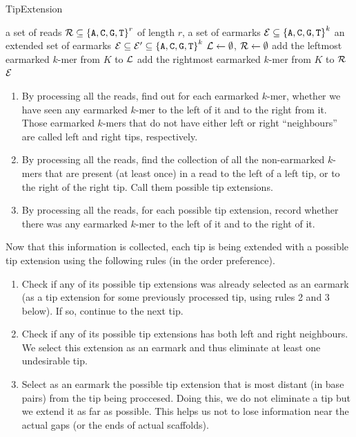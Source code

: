\documentclass[12pt]{article}
\def\acgt{\{{\tt A,C,G,T}\}}
\begin{document}
\begin{algorithm}
\caption{TipExtension}
\label{alg:tipextension}
\begin{algorithmic}%
  \REQUIRE a set of reads ${\cal R} \subseteq {\acgt}^r$ of length $r$, 
    a set of earmarks ${\cal E} \subseteq {\acgt}^k$
  \ENSURE an extended set of earmarks ${\cal E} \subseteq {\cal E'} \subseteq {\acgt}^k$
  \STATE ${\cal L} \gets \emptyset$, ${\cal R} \gets \emptyset$ 
    \STATE add the leftmost earmarked $k$-mer from $K$ to ${\cal L}$
    \STATE add the rightmost earmarked $k$-mer from $K$ to ${\cal R}$
  \ENDFOR
  \RETURN ${\cal E}$
\end{algorithmic}
\end{algorithm}


\begin{enumerate}
\item By processing all the reads, find out for each earmarked $k$-mer, whether we have seen any
earmarked $k$-mer to the left of it and to the right from it.
Those earmarked $k$-mers that do not have either left or right ``neighbours'' are called left and right tips,
respectively.
\item By processing all the reads, find the collection of all the non-earmarked $k$-mers that
are present (at least once) in a read to the left of a left tip, or to the right of the right tip.
Call them possible tip extensions.
\item By processing all the reads, for each possible tip extension, record whether there was
any earmarked $k$-mer to the left of it and to the right of it.
\end{enumerate}

Now that this information is collected, each tip is being extended with
a possible tip extension using the following rules (in the order preference).

\begin{enumerate}
\item Check if any of its possible tip extensions was already selected as an earmark
(as a tip extension for some previously processed tip, using rules 2 and 3 below).
If so, continue to the next tip.
\item Check if any of its possible tip extensions has both left and right neighbours.
We select this extension as an earmark and thus eliminate at least one undesirable tip.
\item Select as an earmark the possible tip extension that is most distant (in base pairs)
from the tip being proccesed. Doing this, we do not eliminate a tip but we extend it as far
as possible. This helps us not to lose information near the actual gaps (or the ends of actual scaffolds).
\end{enumerate}
\end{document}
